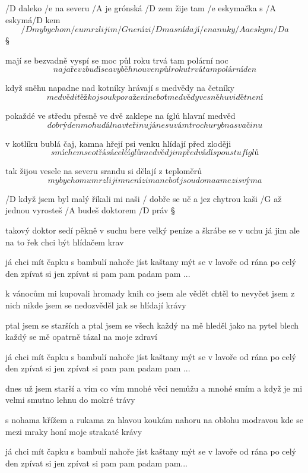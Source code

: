 /D daleko /e na severu /A je grónská /D zem
žije tam /e eskymačka s /A eskymá/D kem
\[ /D my bychom /e umrzli jim /G není zi/D ma
snídají /e nanuky /A a eskym/D a \]\S

mají se bezvadně vyspí se moc
půl roku trvá tam polární noc
\[ na jaře vzbudí se a vyběhnou ven
půl roku trvá tam polární den \]\s

když sněhu napadne nad kotníky
hrávají s medvědy na četníky
\[ medvědi těžko jsou k poražení
neboť medvědy ve sněhu vidět není \]\s

pokaždé ve středu přesně ve dvě
zaklepe na íglů hlavní medvěd
\[ dobrý den mohu dál na vteřinu
já nesu vám trochu ryb na svačinu \]\s

v kotlíku bublá čaj, kamna hřejí
psi venku hlídají před zloději
\[ smíchem se otřásá celé íglů
medvěd jim předvádí spoustu fíglů \]\s

tak žijou vesele na severu
srandu si dělají z teploměrů
\[ my bychom umrzli jim není zima
neboť jsou doma a mezi svýma \]




/D když jsem byl malý říkali mi naši
/ dobře se uč a jez chytrou kaši
/G až jednou vyrosteš /A budeš doktorem /D práv \S

takový doktor sedí pěkně v suchu
bere velký peníze a škrábe se v uchu
já jim ale na to řek chci být hlídačem krav \s

já chci mít čapku s bambulí nahoře
jíst kaštany mýt se v lavoře
od rána po celý den
zpívat si jen
zpívat si pam pam padam pam ... \s

k vánocům mi kupovali hromady knih
co jsem ale vědět chtěl to nevyčet jsem z nich
nikde jsem se nedozvěděl jak se hlídají krávy \s

ptal jsem se starších a ptal jsem se všech
každý na mě hleděl jako na pytel blech
každý se mě opatrně tázal na moje zdraví \s

já chci mít čapku s bambulí nahoře
jíst kaštany mýt se v lavoře
od rána po celý den
zpívat si jen
zpívat si pam pam padam pam ... \s

dnes už jsem starší a vím co vím
mnohé věci nemůžu a mnohé smím
a když je mi velmi smutno lehnu do mokré trávy \s

s nohama křížem a rukama za hlavou
koukám nahoru na oblohu modravou
kde se mezi mraky honí moje strakaté krávy \s

já chci mít čapku s bambulí nahoře
jíst kaštany mýt se v lavoře
od rána po celý den
zpívat si jen
zpívat si pam pam padam pam...



